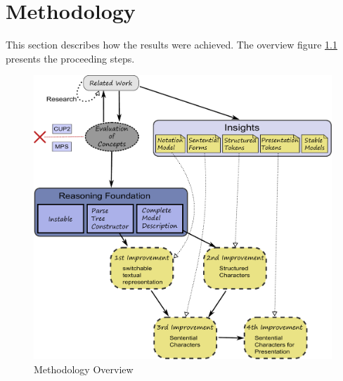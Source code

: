 \chapter{Methodology}
This section describes how the results were achieved. The overview figure \ref{MethodologyFigure} presents the proceeding steps.

\begin{figure}
\centering
\includegraphics[scale=0.47]{gfx/ex/Concept2} 
\caption{Methodology Overview}
\label{MethodologyFigure}
\end{figure}

